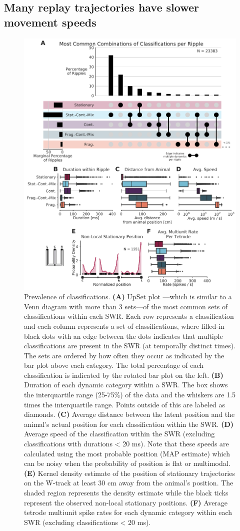 \documentclass[times, twoside]{zHenriquesLab-StyleBioRxiv}
\begin{document}
\subsection*{Many replay trajectories have slower movement speeds}
\begin{figure}%
\centering
\includegraphics[width=0.80\linewidth]{figures/Figure5/Figure5_v4}
\caption{
Prevalence of classifications. \textbf{(A)} UpSet plot \cite{LexUpSetVisualizationIntersecting2014}---which is similar to a Venn diagram with more than 3 sets---of the most common sets of classifications within each SWR. Each row represents a classification and each column represents a set of classifications, where filled-in black dots with an edge between the dots indicates that multiple classifications are present in the SWR (at temporally distinct times). The sets are ordered by how often they occur as indicated by the bar plot above each category. The total percentage of each classification is indicated by the rotated bar plot on the left. \textbf{(B)} Duration of each dynamic category within a SWR. The box shows the interquartile range (25-75\%) of the data and the whiskers are 1.5 times the interquartile range. Points outside of this are labeled as diamonds. \textbf{(C)} Average distance between the latent position and the animal's actual position for each classification within the SWR. \textbf{(D)} Average speed of the classification within the SWR (excluding classifications with durations < 20 ms). Note that these speeds are calculated using the most probable position (MAP estimate) which can be noisy when the probability of position is flat or multimodal.\textbf{(E)} Kernel density estimate of the position of stationary trajectories on the W-track at least 30 cm away from the animal's position. The shaded region represents the density estimate while the black ticks represent the observed non-local stationary positions. \textbf{(F)} Average tetrode multiunit spike rates for each dynamic category within each SWR (excluding classifications < 20 ms).
}
\label{5}
\end{figure}
\end{document}
